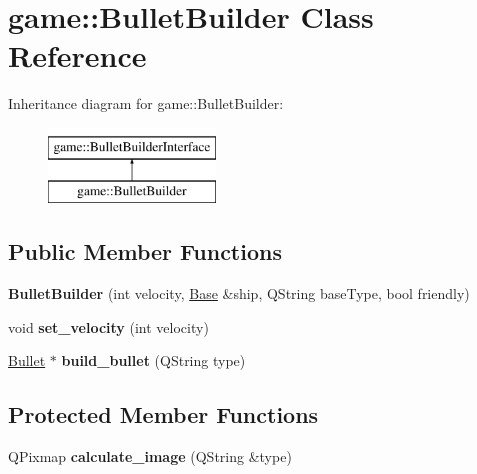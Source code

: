 \hypertarget{classgame_1_1BulletBuilder}{}\section{game\+:\+:Bullet\+Builder Class Reference}
\label{classgame_1_1BulletBuilder}
Inheritance diagram for game\+:\+:Bullet\+Builder\+:\begin{figure}[H]
\begin{center}
\leavevmode
\includegraphics[height=2.000000cm]{classgame_1_1BulletBuilder}
\end{center}
\end{figure}
\subsection*{Public Member Functions}
\begin{DoxyCompactItemize}
\item 
\mbox{\label{classgame_1_1BulletBuilder_ac4cacbec8a7ef228330e43a055ae34ea}} 
{\bfseries Bullet\+Builder} (int velocity, \hyperlink{classgame_1_1Base}{Base} \&ship, Q\+String base\+Type, bool friendly)
\item 
\mbox{\label{classgame_1_1BulletBuilder_ad09b920f426696cd20f7fa8e663dcbe5}} 
void {\bfseries set\+\_\+velocity} (int velocity)
\item 
\mbox{\label{classgame_1_1BulletBuilder_a722a4f9f2fc0ca1658cf04b227af1ee3}} 
\hyperlink{classgame_1_1Bullet}{Bullet} $\ast$ {\bfseries build\+\_\+bullet} (Q\+String type)
\end{DoxyCompactItemize}
\subsection*{Protected Member Functions}
\begin{DoxyCompactItemize}
\item 
\mbox{\label{classgame_1_1BulletBuilder_a0247bd0b50739729155d74f28b34e883}} 
Q\+Pixmap {\bfseries calculate\+\_\+image} (Q\+String \&type)
\end{DoxyCompactItemize}
